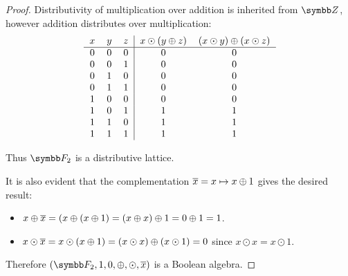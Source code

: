 \begin{proof}
  Distributivity of multiplication over addition is inherited from \( \Z \), however addition distributes over multiplication:
  \begin{equation*}
    \begin{tabular}{c c c | c c}
      \( x \)    & \( y \)    & \( z \)    & \(x \odot (y \oplus z) \) & \( (x \odot y) \oplus (x \odot z) \) \\
      \hline
      \( 0 \)    & \( 0 \)    & \( 0 \)    & \( 0 \)                   & \( 0 \) \\
      \( 0 \)    & \( 0 \)    & \( 1 \)    & \( 0 \)                   & \( 0 \) \\
      \( 0 \)    & \( 1 \)    & \( 0 \)    & \( 0 \)                   & \( 0 \) \\
      \( 0 \)    & \( 1 \)    & \( 1 \)    & \( 0 \)                   & \( 0 \) \\
      \( 1 \)    & \( 0 \)    & \( 0 \)    & \( 0 \)                   & \( 0 \) \\
      \( 1 \)    & \( 0 \)    & \( 1 \)    & \( 1 \)                   & \( 1 \) \\
      \( 1 \)    & \( 1 \)    & \( 0 \)    & \( 1 \)                   & \( 1 \) \\
      \( 1 \)    & \( 1 \)    & \( 1 \)    & \( 1 \)                   & \( 1 \)
    \end{tabular}
  \end{equation*}

  Thus \( \F_2 \) is a distributive lattice.

  It is also evident that the complementation \( \overline{x} = x \mapsto x \oplus 1 \) gives the desired result:
  \begin{itemize}
    \item \( x \oplus \overline{x} = ( x \oplus (x \oplus 1) = (x \oplus x) \oplus 1 = 0 \oplus 1 = 1 \).
    \item \( x \odot \overline{x} = x \odot (x \oplus 1) = (x \odot x) \oplus (x \odot 1) = 0 \) since \( x \odot x = x \odot 1 \).
  \end{itemize}

  Therefore \( (\F_2, 1, 0, \oplus, \odot, \Ol x ) \) is a Boolean algebra.
\end{proof}
